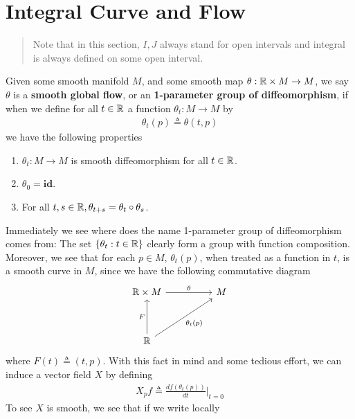 \documentclass{report}
\begin{document}
\section{Integral Curve and Flow}
\begin{abstract}
Note that in this section, $I,J$ always stand for open intervals and integral is always defined on some open interval. 
\end{abstract}
\begin{mdframed}
Given some smooth manifold $M$, and some smooth map $\theta :\mathbb{R} \times M\rightarrow M$, we say $\theta$ is a \textbf{smooth global flow}, or an \textbf{1-parameter group of diffeomorphism}, if when we define for all $t\in\mathbb{R}$ a function $\theta_t:M\rightarrow M$ by
\begin{align*}
\theta_t(p)\triangleq \theta (t,p)
\end{align*}
we have the following properties 
\begin{enumerate}[label=(\roman*)]
  \item $\theta_t:M\rightarrow M$ is smooth diffeomorphism for all $t\in\mathbb{R}$. 
  \item $\theta_0=\textbf{id}$. 
  \item For all $t,s \in\mathbb{R},\theta_{t+s}=\theta_t \circ \theta_s$. 
\end{enumerate}
Immediately we see where does the name 1-parameter group of diffeomorphism comes from: The set  $\{ \theta_t: t\in\mathbb{R} \}$ clearly form a group with function composition. Moreover, we see that for each $p\in  M$, $\theta_t(p)$, when treated as a function in $t$, is a smooth curve in $M$, since we have the following commutative diagram 
\[\begin{tikzcd}
	{\mathbb{R}\times M} && M \\
	\\
	{\mathbb{R}}
	\arrow["\theta", from=1-1, to=1-3]
	\arrow["F", from=3-1, to=1-1]
	\arrow["{\theta_t(p)}"', from=3-1, to=1-3]
\end{tikzcd}\]
where $F(t)\triangleq (t,p)$. With this fact in mind and some tedious effort, we can induce a vector field $X$ by defining 
\begin{align}
\label{indf}
X_pf\triangleq \frac{df(\theta_t(p))}{dt}\Big|_{t=0}
\end{align}
To see $X$ is smooth, we see that if we write locally  
\begin{align*}

\end{align*}
\end{mdframed}
\end{document}
